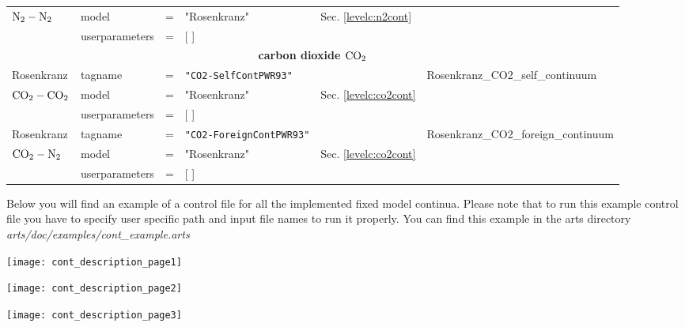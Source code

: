 \begin{landscape}
\begin{longtable}{llllll}
$\mbox{N}_2-\mbox{N}_2$   & model &=& "Rosenkranz" &  {\small Sec. \ref{levelc:n2cont}} &  \\ 
            & userparameters &=& [ ] &   & \\
 \hline
 \multicolumn{6}{c}{{\bf carbon dioxide $\mbox{CO}_2$}}\\
 \hline
 Rosenkranz & tagname &=& {\small \tt "CO2-SelfContPWR93"} & {\small \cite{pwr:93}} & 
              {\small Rosenkranz\_CO2\_self\_continuum}\\
$\mbox{CO}_2-\mbox{CO}_2$ & model &=& "Rosenkranz" &   {\small Sec. \ref{levelc:co2cont}} &  \\  
            & userparameters &=& [ ] &   & \\

 Rosenkranz & tagname &=& {\small \tt "CO2-ForeignContPWR93"} & {\small \cite{pwr:93}} & 
              {\small Rosenkranz\_CO2\_foreign\_continuum}\\
$\mbox{CO}_2-\mbox{N}_2$  & model &=& "Rosenkranz" &  {\small Sec. \ref{levelc:co2cont}}  &  \\  
            & userparameters &=& [ ] &   & \\

 \hline
 \end{longtable}
 \setlength{\LTcapwidth}{0.8\textwidth}
\end{landscape}



\label{leveld:ArtsContExampleControlFile}
Below you will find an example of a control file for all 
the implemented fixed model continua. Please note that
to run this example control file you have to specify
user specific path and input file names to run it 
properly. You can find this example in the arts directory 
{\it arts/doc/examples/cont\_example.arts}



\begin{flushleft}
 \texttt{[image: cont\_description\_page1]}
\end{flushleft}
\begin{flushleft}
 \texttt{[image: cont\_description\_page2]}
\end{flushleft}
\begin{flushleft}
 \texttt{[image: cont\_description\_page3]}
\end{flushleft}



